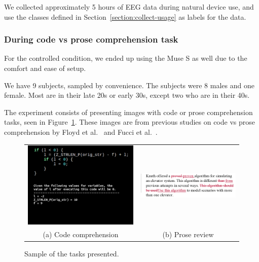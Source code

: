             We collected approximately 5 hours of EEG data during natural device use, and use the classes defined in Section~\ref{section:collect-usage} as labels for the data.

        \subsubsection*{During code vs prose comprehension task}

            For the controlled condition, we ended up using the Muse S as well due to the comfort and ease of setup.

            We have 9 subjects, sampled by convenience. The subjects were 8 males and one female. Most are in their late 20s or early 30s, except two who are in their 40s.

            The experiment consists of presenting images with code or prose comprehension tasks, seen in Figure~\ref{fig:tasks}. These images are from previous studies on code vs prose comprehension by Floyd et al.~\cite{floyd_decoding_2017} and Fucci et al.~\cite{fucci_replication_2019}. 

            \begin{figure}[H]
                \centering
                \begin{tabular}{cc}
                    \includegraphics[trim=25 160 0 0,clip,width=75mm]{img/final-1-1.png}
                    &
                    \includegraphics[trim=20 0 20 0,clip,width=75mm]{img/bugs_1.PNG}
                    \\
                    (a) Code comprehension
                    &
                    (b) Prose review
                \end{tabular}
                \caption{Sample of the tasks presented.}\label{fig:tasks}
            \end{figure}

